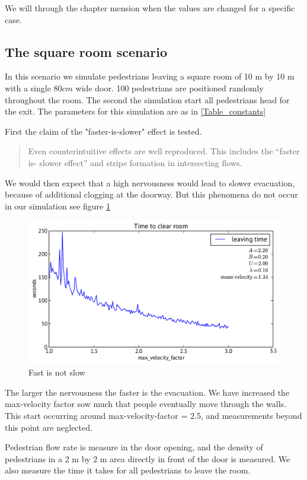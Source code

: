 We will through the chapter mension when the values are changed for a specific case. 

\subsection{The square room scenario}
In this scenario we simulate pedestrians leaving a square room of 10 m by 10 m with a single $80cm$ wide door. 100 pedestrians are positioned randomly throughout the room. The second the simulation start all pedestrians head for the exit. The parameters for this simulation are as in \ref{Table_constants}

First the claim of the "faster-is-slower" effect is tested.
\begin{quote}
Even counterintuitive
effects are well reproduced. This includes the “faster is-
slower effect” and stripe formation in intersecting flows. \cite{self-org}
\end{quote}
We would then expect that a high nervousness would lead to slower evacuation, because of additional clogging at the doorway. But this phenomena do not occur in our simulation see figure \ref{FastIsSlow}
\begin{figure}
\centering
\includegraphics[scale=0.5]{Figures/fastIsSlowNot}
\caption{Fast is not slow}
\label{FastIsSlow}
\end{figure}
The larger the nervousness the faster is the evacuation. We have increased the max-velocity factor sow much that people eventually move through the walls. This start occurring around max-velocity-factor = 2.5, and measurements beyond this point are neglected.

Pedestrian flow rate is measure in the door opening, and the density of pedestrians in a 2 m by 2 m area directly in front of the door is measured. We also measure the time it takes for all pedestrians to leave the room.

